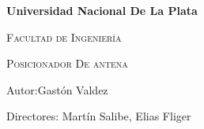 
\begin{titlepage} 
	\begin{center}
		{\LARGE \textbf{Universidad Nacional De La Plata}}
	\end{center} 
		 {\scshape\Large Facultad de Ingenier\'ia \par}
	 {\scshape\Huge Posicionador De antena \par}		
	 {\Large Autor:Gastón Valdez \par}
	 {\Large Directores: Martín Salibe, Elias Fliger \par} 
	 \vfill



\end{titlepage}